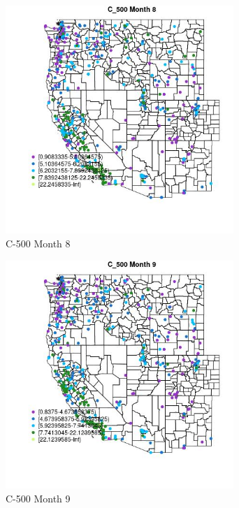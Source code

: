 \begin{figure} 
\centering  
\includegraphics[width=0.77\textwidth]{Code_Outputs/ML_input_report_ML_input_PM25_Step5_part_d_de_duplicated_aves_ML_input_MapObsMo8C_500.jpg} 
\caption{\label{fig:ML_input_report_ML_input_PM25_Step5_part_d_de_duplicated_aves_ML_inputMapObsMo8C_500}C-500 Month 8} 
\end{figure} 
 

\begin{figure} 
\centering  
\includegraphics[width=0.77\textwidth]{Code_Outputs/ML_input_report_ML_input_PM25_Step5_part_d_de_duplicated_aves_ML_input_MapObsMo9C_500.jpg} 
\caption{\label{fig:ML_input_report_ML_input_PM25_Step5_part_d_de_duplicated_aves_ML_inputMapObsMo9C_500}C-500 Month 9} 
\end{figure} 
 

